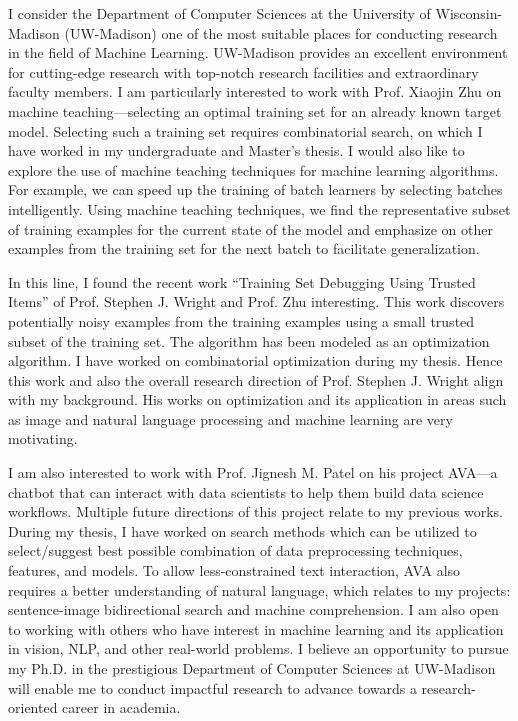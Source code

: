 \documentclass[12pt]{article}
\begin{document}
I consider the Department of Computer Sciences at the University of Wisconsin-Madison (UW-Madison) one of the most suitable places for conducting research in the field of Machine Learning. UW-Madison provides an excellent environment for cutting-edge research with top-notch research facilities and extraordinary faculty members. I am particularly interested to work with Prof. Xiaojin Zhu on machine teaching---selecting an optimal training set for an already known target model. Selecting such a training set requires combinatorial search, on which I have worked in my undergraduate and Master's thesis. I would also like to explore the use of machine teaching techniques for machine learning algorithms. For example, we can speed up the training of batch learners by selecting batches intelligently. Using machine teaching techniques, we find the representative subset of training examples for the current state of the model and emphasize on other examples from the training set for the next batch to facilitate generalization. 

In this line, I found the recent work ``Training Set Debugging Using Trusted Items'' of Prof. Stephen J. Wright and Prof. Zhu interesting. This work discovers potentially noisy examples from the training examples using a small trusted subset of the training set. The algorithm has been modeled as an optimization algorithm. I have worked on combinatorial optimization during my thesis. Hence this work and also the overall research direction of Prof. Stephen J. Wright align with my background. His works on optimization and its application in areas such as image and natural language processing and machine learning are very motivating.  

I am also interested to work with Prof. Jignesh M. Patel on his project AVA---a chatbot that can interact with data scientists to help them build data science workflows. Multiple future directions of this project relate to my previous works. During my thesis, I have worked on search methods which can be utilized to select/suggest best possible combination of data preprocessing techniques, features, and models. To allow less-constrained text interaction, AVA also requires a better understanding of natural language, which relates to my projects: sentence-image bidirectional search and machine comprehension.  I am also open to working with others who have interest in machine learning and its application in vision, NLP, and other real-world problems. I believe an opportunity to pursue my Ph.D. in the prestigious Department of Computer Sciences at UW-Madison will enable me to conduct impactful research to advance towards a research-oriented career in academia. 
\end{document}
